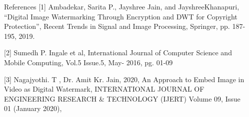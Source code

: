 \documentclass[final]{beamer}
\newlength{\sepwidth}
\newlength{\colwidth}
\newcommand{\separatorcolumn}{\begin{column}{\sepwidth}\end{column}}
\begin{document}
\begin{frame}[t]
\begin{columns}[t]
\begin{column}{\colwidth}
\begin{block}{References}
[1] Ambadekar, Sarita P., Jayshree Jain, and JayshreeKhanapuri, 
“Digital Image Watermarking Through Encryption and DWT for 
Copyright Protection”, Recent Trends in Signal and Image 
Processing, Springer, pp. 187-195, 2019.

[2] Sumedh P. Ingale et al, International Journal of Computer Science and Mobile Computing, Vol.5 Issue.5, May- 2016, pg. 01-09

[3] Nagajyothi. T , Dr. Amit Kr. Jain, 2020, An Approach to Embed Image in Video as Digital Watermark, INTERNATIONAL JOURNAL OF ENGINEERING RESEARCH & TECHNOLOGY (IJERT) Volume 09, Issue 01 (January 2020),



% 
% 

\end{block}
\end{column}

\separatorcolumn
\end{columns}
\end{frame}
\end{document}
